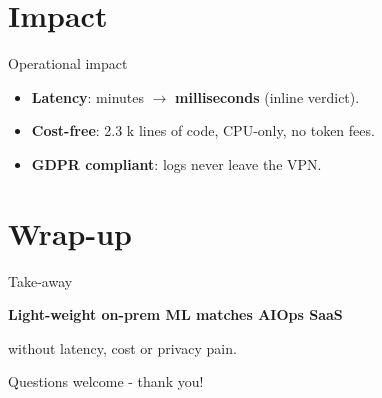 \documentclass[15pt,aspectratio=169]{beamer}
\newcommand{\LOC}{lines of code\xspace}
\begin{document}
\section{Impact}

\begin{frame}{Operational impact}
\begin{itemize}[<+->]
  \item \textbf{Latency}: minutes $\rightarrow$ \textbf{milliseconds} (inline verdict).
  \item \textbf{Cost-free}: 2.3 k \LOC{}, CPU-only, no token fees.
  \item \textbf{GDPR compliant}: logs never leave the VPN.
\end{itemize}
\end{frame}

\section{Wrap-up}

\begin{frame}{Take-away}
\vspace{2em}
\centering
{\Large
  \textbf{Light-weight on-prem ML matches AIOps SaaS}\par
  \vspace{.4em}
  without latency, cost or privacy pain.
}

\vspace{2.2em}
\small
Questions welcome - thank you!
\end{frame}
\end{document}
